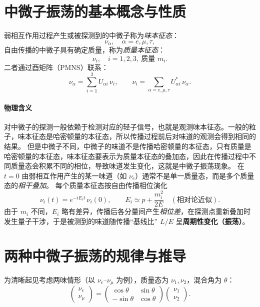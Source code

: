 
\section{中微子振荡的基本概念与性质}
弱相互作用过程产生或被探测到的中微子称为\emph{味本征态}：
\[
\nu_\alpha,\quad \alpha=e,\mu,\tau,
\]
自由传播的中微子具有确定质量，称为\emph{质量本征态}：
\[
\nu_i,\quad i=1,2,3,\ \text{质量 } m_i.
\]
二者通过酉矩阵（PMNS）联系：
\begin{equation}\label{eq:pmns}
\nu_\alpha=\sum_{i=1}^3 U_{\alpha i}\,\nu_i,\qquad
\nu_i=\sum_{\alpha=e,\mu,\tau}U^{*}_{\alpha i}\,\nu_\alpha.
\end{equation}
\paragraph{物理含义}
对中微子的探测一般依赖于检测对应的轻子信号，也就是观测味本征态。一般的粒子，味本征态是哈密顿量的本征态，所以传播过程前后对味道的观测会得到相同的结果。
但是中微子不同，中微子的味道不是传播哈密顿量的本征态，只有质量是哈密顿量的本征态，味本征态要表示为质量本征态的叠加态，因此在传播过程中不同质量态会积累不同的相位，导致味道发生变化，这就是中微子振荡现象。
在 $t=0$ 由弱相互作用产生的某一味道（如 $\nu_e$）通常不是单一质量态，而是多个质量态的\emph{相干叠加}。
每个质量本征态按自由传播相位演化
\begin{equation}\label{eq:phase}
\nu_i(t)=e^{-iE_i t}\,\nu_i(0),\qquad
E_i\simeq p+\frac{m_i^{2}}{2E}\quad(\text{相对论近似}).
\end{equation}
由于 $m_i$ 不同，$E_i$ 略有差异，传播后各分量间产生\emph{相位差}，在探测点重新叠加时发生量子干涉，于是被测到的味道随传播“基线比” $L/E$ 呈\textbf{周期性变化（振荡）}。

\section{两种中微子振荡的规律与推导}
为清晰起见考虑两味情形（以 $\nu_e$--$\nu_\mu$ 为例），质量态为 $\nu_1,\nu_2$，混合角为 $\theta$：
\begin{equation}\label{eq:2mix}
\begin{pmatrix}\nu_e\\[2pt]\nu_\mu\end{pmatrix}
=
\begin{pmatrix}\cos\theta & \sin\theta\\[2pt]-\sin\theta & \cos\theta\end{pmatrix}
\begin{pmatrix}\nu_1\\[2pt]\nu_2\end{pmatrix}.
\end{equation}

